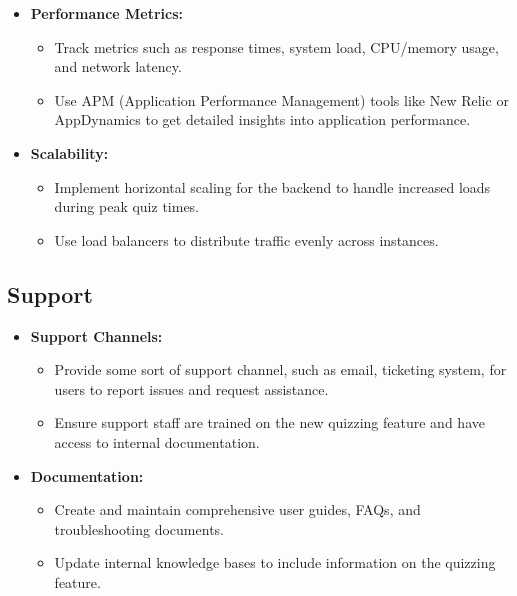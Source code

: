 \begin{itemize}
    \item \textbf{Performance Metrics:}
          \begin{itemize}
              \item Track metrics such as response times, system load, CPU/memory usage, and network latency.
              \item Use APM (Application Performance Management) tools like New Relic or AppDynamics to get detailed insights into application performance.
          \end{itemize}
    \item \textbf{Scalability:}
          \begin{itemize}
              \item Implement horizontal scaling for the backend to handle increased loads during peak quiz times.
              \item Use load balancers to distribute traffic evenly across instances.
          \end{itemize}
\end{itemize}


\subsection{Support}

\begin{itemize}
    \item \textbf{Support Channels:}
          \begin{itemize}
              \item Provide some sort of support channel, such as email, ticketing system, for users to report issues and request assistance.
              \item Ensure support staff are trained on the new quizzing feature and have access to internal documentation.
          \end{itemize}
    \item \textbf{Documentation:}
          \begin{itemize}
              \item Create and maintain comprehensive user guides, FAQs, and troubleshooting documents.
              \item Update internal knowledge bases to include information on the quizzing feature.
          \end{itemize}
\end{itemize}


